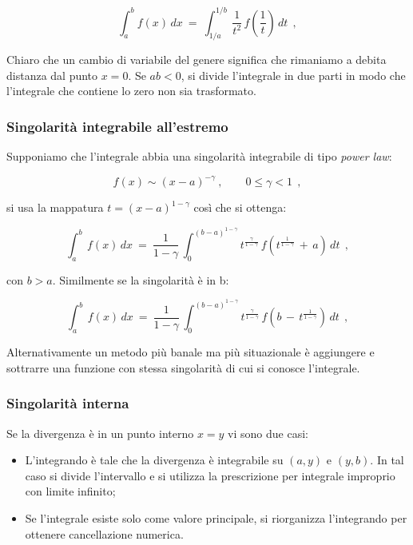 \documentclass{article}
\begin{document}
	\[ \int_a^b f(x)\,dx
	\ =\
	\int_{1/a}^{1/b}
	\,\frac{1}{t^2} \,f\!\left(\frac{1}{t}\right) \,dt\ \ ,\]
	
	Chiaro che un cambio di variabile del genere significa che rimaniamo a debita distanza dal punto $x=0$. Se $ab<0$, si divide l’integrale in due parti in modo che l'integrale che contiene lo zero non sia trasformato.
	
	\subsubsection{Singolarità integrabile all’estremo}
	
	Supponiamo che l'integrale abbia una singolarità integrabile di tipo \emph{power law}:
	
	\[
	f(x) \sim (x-a)^{-\gamma}\ ,
	\qquad 0 \le \gamma < 1\ \ ,
	\]
	
	si usa la mappatura $t = (x-a)^{1-\gamma}$ così che si ottenga:
	
	\[
	\int_a^b\, f(x)\,dx
	\ =\
	\frac{1}{1-\gamma}
	\,\int_0^{(b-a)^{1-\gamma}}
	t^{\frac{\gamma}{1-\gamma}}\, 
	f\!\left(t^{\frac{1}{1-\gamma}}\, +\, a\right) \,dt\ \ ,
	\]
	
	con $b>a$. Similmente se la singolarità è in b:
	
	\[
	\int_a^b\, f(x)\,dx
	\ =\
	\frac{1}{1-\gamma}
	\,\int_0^{(b-a)^{1-\gamma}}
	t^{\frac{\gamma}{1-\gamma}}\, 
	f\!\left( b\, -\, t^{\frac{1}{1-\gamma}}\right) \,dt\ \ ,
	\]
	
	Alternativamente un metodo più banale ma più situazionale è aggiungere e sottrarre una funzione con stessa singolarità di cui si conosce l'integrale.
	
	\subsubsection{Singolarità interna}
	
	Se la divergenza è in un punto interno $x=y$ vi sono due casi:
	
	\begin{itemize}
		\item L'integrando è tale che la divergenza è integrabile su $(a,y)$ e $(y,b)$. In tal caso si divide l’intervallo e si utilizza la prescrizione per integrale improprio con limite infinito;
		\item Se l’integrale esiste solo come valore principale, si riorganizza l’integrando per ottenere cancellazione numerica.
	\end{itemize}
	
\end{document}
